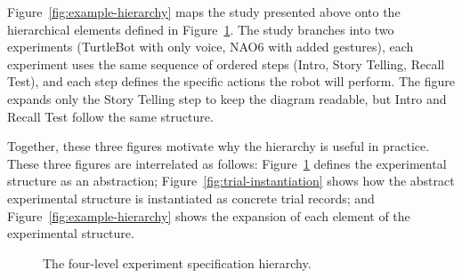 Figure~\ref{fig:example-hierarchy} maps the study presented above onto the hierarchical elements defined in Figure~\ref{fig:experiment-hierarchy}. The study branches into two experiments (TurtleBot with only voice, NAO6 with added gestures), each experiment uses the same sequence of ordered steps (Intro, Story Telling, Recall Test), and each step defines the specific actions the robot will perform. The figure expands only the Story Telling step to keep the diagram readable, but Intro and Recall Test follow the same structure.

Together, these three figures motivate why the hierarchy is useful in practice. These three figures are interrelated as follows: Figure~\ref{fig:experiment-hierarchy} defines the experimental structure as an abstraction; Figure~\ref{fig:trial-instantiation} shows how the abstract experimental structure is instantiated as concrete trial records; and Figure~\ref{fig:example-hierarchy} shows the expansion of each element of the experimental structure.

\begin{figure}[htbp]
\centering
{}
\caption{The four-level experiment specification hierarchy.}
\label{fig:experiment-hierarchy}
\end{figure}

